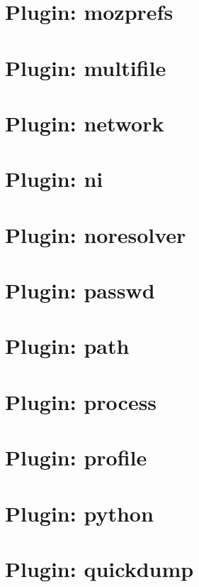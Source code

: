 \documentclass[twoside]{book}
\newcommand{\+}{\discretionary{\mbox{\scriptsize$\hookleftarrow$}}{}{}}
\begin{document}
\chapter{Plugin\+: mozprefs}
\label{autotoc_md447}

\chapter{Plugin\+: multifile}
\label{autotoc_md454}

\chapter{Plugin\+: network}
\label{autotoc_md459}

\chapter{Plugin\+: ni}
\label{autotoc_md475}

\chapter{Plugin\+: noresolver}
\label{autotoc_md485}

\chapter{Plugin\+: passwd}
\label{autotoc_md486}

\chapter{Plugin\+: path}
\label{autotoc_md492}

\chapter{Plugin\+: process}
\label{autotoc_md501}

\chapter{Plugin\+: profile}
\label{autotoc_md508}

\chapter{Plugin\+: python}
\label{autotoc_md510}

\chapter{Plugin\+: quickdump}
\label{autotoc_md517}

\end{document}
